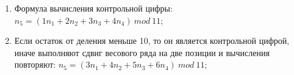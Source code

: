 \begin{enumerate}
\item
Формула вычисления контрольной цифры:
$n_5 = (1n_1 + 2n_2 + 3n_3 + 4n_4) \ mod  \ 11 $;

\item
Если остаток от деления меньше 10, то он является контрольной цифрой, иначе выполняют сдвиг весового ряда на две позиции и вычисления повторяют:
$n_5 = (3n_1 + 4n_2 + 5n_3 + 6n_4) \ mod  \ 11 $;

\end{enumerate}